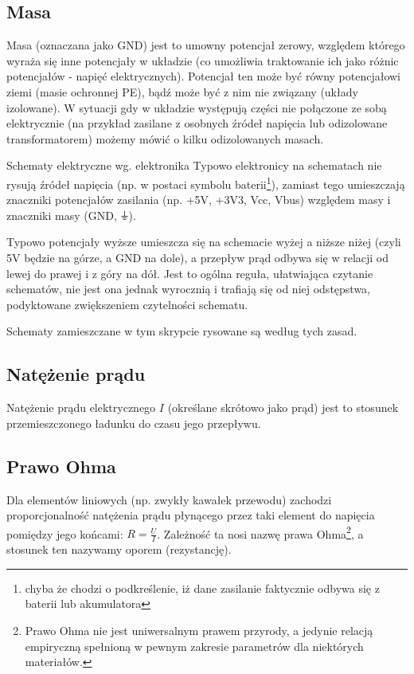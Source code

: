 \subsection{Masa}
   Masa (oznaczana jako GND) jest to
   umowny potencjał zerowy, względem którego wyraża się inne potencjały w układzie (co umożliwia traktowanie ich jako różnic potencjałów - napięć elektrycznych). Potencjał ten może być równy potencjałowi ziemi (masie ochronnej PE), bądź może być z nim nie związany (układy izolowane).
   W sytuacji gdy w układzie występują części nie połączone ze sobą elektrycznie (na przykład zasilane z osobnych źródeł napięcia lub odizolowane transformatorem) możemy mówić o kilku odizolowanych masach.

\begin{ProTip}{Schematy elektryczne wg. elektronika}
Typowo elektronicy na schematach nie rysują źródeł napięcia (np. w postaci symbolu baterii\footnote{chyba że chodzi o podkreślenie, iż dane zasilanie faktycznie odbywa się z baterii lub akumulatora}),
zamiast tego umieszczają znaczniki potencjałów zasilania (np. +5V, +3V3, Vcc, Vbus) względem masy i znaczniki masy (GND, {\Symbola ⏚}).

\vspace{3pt}Typowo potencjały wyższe umieszcza się na schemacie wyżej a niższe niżej (czyli 5V będzie na górze, a GND na dole), a przepływ prąd odbywa się w relacji od lewej do prawej i z góry na dół.
Jest to ogólna reguła, ułatwiająca czytanie schematów, nie jest ona jednak wyrocznią i trafiają się od niej odstępstwa, podyktowane zwiększeniem czytelności schematu.

\vspace{3pt}Schematy zamieszczane w tym skrypcie rysowane są według tych zasad.
\end{ProTip}

\subsection{Natężenie prądu}
    Natężenie prądu elektrycznego $I$ (określane skrótowo jako prąd)
    jest to stosunek przemieszczonego ładunku do czasu jego przepływu.

\subsection{Prawo Ohma}
Dla elementów liniowych (np. zwykły kawałek przewodu) zachodzi proporcjonalność natężenia prądu płynącego przez taki element do napięcia pomiędzy jego końcami: $R=\frac{U}{I}$.
Zależność ta nosi nazwę prawa Ohma\footnote{Prawo Ohma nie jest uniwersalnym prawem przyrody, a jedynie relacją empiryczną spełnioną w pewnym zakresie parametrów dla niektórych materiałów.}, a stosunek ten nazywamy oporem (rezystancję).

